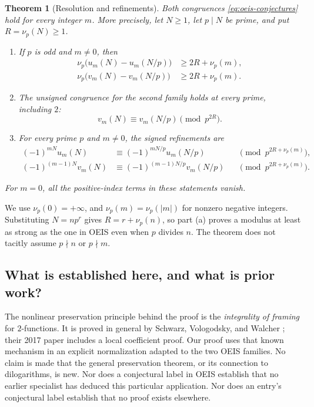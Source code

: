 \documentclass[11pt,letterpaper]{article}
\numberwithin{equation}{section}
\newtheorem{theorem}{Theorem}[section]
\theoremstyle{definition}
\begin{document}
\begin{theorem}[Resolution and refinements]\label{thm:main}
Both congruences \eqref{eq:oeis-conjectures} hold for every integer $m$.
More precisely, let $N\geq1$, let $p\mid N$ be prime, and put
$R=\nu_p(N)\geq1$.
\begin{enumerate}[label=\textup{(\alph*)}]
\item If $p$ is odd and $m\neq0$, then
\begin{equation}\label{eq:main-odd}
\begin{split}
\nu_p\bigl(u_m(N)-u_m(N/p)\bigr)&\geq2R+\nu_p(m),\\
\nu_p\bigl(v_m(N)-v_m(N/p)\bigr)&\geq2R+\nu_p(m).
\end{split}
\end{equation}
\item The unsigned congruence for the second family holds at every prime,
including $2$:
\begin{equation}\label{eq:main-v-all}
v_m(N)\equiv v_m(N/p)\pmod{p^{2R}}.
\end{equation}
\item For every prime $p$ and $m\neq0$, the signed refinements are
\begin{equation}\label{eq:main-signed}
\begin{aligned}
(-1)^{mN}u_m(N)
&\equiv(-1)^{mN/p}u_m(N/p)
&&\pmod{p^{2R+\nu_p(m)}},\\
(-1)^{(m-1)N}v_m(N)
&\equiv(-1)^{(m-1)N/p}v_m(N/p)
&&\pmod{p^{2R+\nu_p(m)}}.
\end{aligned}
\end{equation}
\end{enumerate}
For $m=0$, all the positive-index terms in these statements vanish.
\end{theorem}

We use $\nu_p(0)=+\infty$, and $\nu_p(m)=\nu_p(|m|)$ for nonzero
negative integers. Substituting $N=np^r$ gives
$R=r+\nu_p(n)$, so part (a) proves a modulus at least as strong as the
one in OEIS even when $p$ divides $n$. The theorem does not tacitly
assume $p\nmid n$ or $p\nmid m$.

\subsection*{What is established here, and what is prior work?}
The nonlinear preservation principle behind the proof is the
\emph{integrality of framing} for $2$-functions. It is proved in general
by Schwarz, Vologodsky, and Walcher \cite{svw2013,svw2017}; their 2017
paper includes a local coefficient proof. Our proof uses that known
mechanism in an explicit normalization adapted to the two OEIS families.
No claim is made that the general preservation theorem, or its connection
to dilogarithms, is new. Nor does a conjectural label in OEIS establish
that no earlier specialist has deduced this particular application.
Nor does an entry's conjectural label establish that no proof exists
elsewhere.
\end{document}
